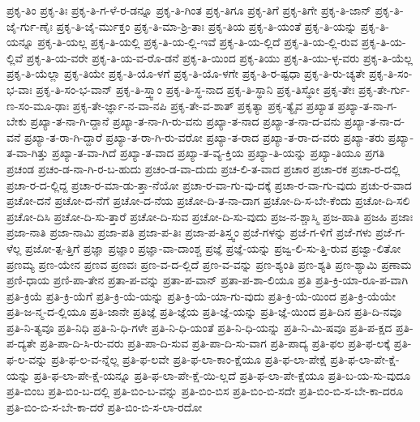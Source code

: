 {ಪ್ರಕೃ-ತಿಂ
ಪ್ರಕೃ-ತಿಃ
ಪ್ರಕೃ-ತಿ-ಗ-ಳೆ-ರ-ಡನ್ನೂ
ಪ್ರಕೃ-ತಿ-ಗಿಂತ
ಪ್ರಕೃ-ತಿಗೂ
ಪ್ರಕೃ-ತಿಗೆ
ಪ್ರಕೃ-ತಿಗೇ
ಪ್ರಕೃ-ತಿ-ಜಾನ್
ಪ್ರಕೃ-ತಿ-ಜೈ-ರ್ಗು-ಣೈಃ
ಪ್ರಕೃ-ತಿ-ಜೈ-ರ್ಮುಕ್ತಂ
ಪ್ರಕೃ-ತಿ-ಮಾ-ಶ್ರಿ-ತಾಃ
ಪ್ರಕೃ-ತಿಯ
ಪ್ರಕೃ-ತಿ-ಯಂತೆ
ಪ್ರಕೃ-ತಿ-ಯನ್ನು
ಪ್ರಕೃ-ತಿ-ಯನ್ನೂ
ಪ್ರಕೃ-ತಿ-ಯಲ್ಲ
ಪ್ರಕೃ-ತಿ-ಯಲ್ಲಿ
ಪ್ರಕೃ-ತಿ-ಯ-ಲ್ಲಿ-ಇವೆ
ಪ್ರಕೃ-ತಿ-ಯ-ಲ್ಲಿದೆ
ಪ್ರಕೃ-ತಿ-ಯ-ಲ್ಲಿ-ರುವ
ಪ್ರಕೃ-ತಿ-ಯ-ಲ್ಲಿವೆ
ಪ್ರಕೃ-ತಿ-ಯ-ವರೇ
ಪ್ರಕೃ-ತಿ-ಯ-ವ-ರೊ-ಡನೆ
ಪ್ರಕೃ-ತಿ-ಯಿಂದ
ಪ್ರಕೃ-ತಿಯು
ಪ್ರಕೃ-ತಿ-ಯು-ಳ್ಳ-ವರು
ಪ್ರಕೃ-ತಿ-ಯೆಲ್ಲ
ಪ್ರಕೃ-ತಿ-ಯೆಲ್ಲಾ
ಪ್ರಕೃ-ತಿಯೇ
ಪ್ರಕೃ-ತಿ-ಯೊ-ಳಗೆ
ಪ್ರಕೃ-ತಿ-ಯೊ-ಳಗೇ
ಪ್ರಕೃ-ತಿ-ರ-ಷ್ಟಧಾ
ಪ್ರಕೃ-ತಿ-ರು-ಚ್ಯತೇ
ಪ್ರಕೃ-ತಿ-ಸಂ-ಭ-ವಾಃ
ಪ್ರಕೃ-ತಿ-ಸಂ-ಭ-ವಾನ್
ಪ್ರಕೃ-ತಿ-ಸ್ತ್ವಾಂ
ಪ್ರಕೃ-ತಿ-ಸ್ಥ-ನಾದ
ಪ್ರಕೃ-ತಿ-ಸ್ಥಾನಿ
ಪ್ರಕೃ-ತಿಸ್ಥೋ
ಪ್ರಕೃ-ತೇಃ
ಪ್ರಕೃ-ತೇ-ರ್ಗು-ಣ-ಸಂ-ಮೂ-ಢಾಃ
ಪ್ರಕೃ-ತೇ-ರ್ಜ್ಞಾ-ನ-ವಾ-ನಪಿ
ಪ್ರಕೃ-ತೇ-ವ-ಶಾತ್
ಪ್ರಕೃತ್ಯಾ
ಪ್ರಕೃ-ತ್ಯೈವ
ಪ್ರಖ್ಯಾತ
ಪ್ರಖ್ಯಾ-ತ-ನಾ-ಗ-ಬೇಕು
ಪ್ರಖ್ಯಾ-ತ-ನಾ-ಗಿ-ದ್ದಾನೆ
ಪ್ರಖ್ಯಾ-ತ-ನಾ-ಗಿ-ರು-ವನು
ಪ್ರಖ್ಯಾ-ತ-ನಾದ
ಪ್ರಖ್ಯಾ-ತ-ನಾ-ದ-ವನು
ಪ್ರಖ್ಯಾ-ತ-ನಾ-ದ-ವನೆ
ಪ್ರಖ್ಯಾ-ತ-ರಾ-ಗಿ-ದ್ದಾರೆ
ಪ್ರಖ್ಯಾ-ತ-ರಾ-ಗಿ-ರು-ವರೋ
ಪ್ರಖ್ಯಾ-ತ-ರಾದ
ಪ್ರಖ್ಯಾ-ತ-ರಾ-ದ-ವರು
ಪ್ರಖ್ಯಾ-ತರು
ಪ್ರಖ್ಯಾ-ತ-ವಾ-ಗಿತ್ತು
ಪ್ರಖ್ಯಾ-ತ-ವಾ-ಗಿದೆ
ಪ್ರಖ್ಯಾ-ತ-ವಾದ
ಪ್ರಖ್ಯಾ-ತ-ವ್ಯ-ಕ್ತಿಯ
ಪ್ರಖ್ಯಾ-ತಿ-ಯನ್ನು
ಪ್ರಖ್ಯಾ-ತಿಯೂ
ಪ್ರಗತಿ
ಪ್ರಚಂಡ
ಪ್ರಚಂ-ಡ-ನಾ-ಗಿ-ರ-ಬ-ಹುದು
ಪ್ರಚಂ-ಡ-ವಾ-ದುದು
ಪ್ರಚ-ಲಿ-ತ-ವಾದ
ಪ್ರಚಾರ
ಪ್ರಚಾ-ರಕ
ಪ್ರಚಾ-ರ-ದಲ್ಲಿ
ಪ್ರಚಾ-ರ-ದ-ಲ್ಲಿದ್ದ
ಪ್ರಚಾ-ರ-ಮಾ-ಡು-ತ್ತಾ-ನೆಯೋ
ಪ್ರಚಾ-ರ-ವಾ-ಗು-ವು-ದಕ್ಕೆ
ಪ್ರಚಾ-ರ-ವಾ-ಗು-ವುದು
ಪ್ರಚು-ರ-ವಾದ
ಪ್ರಚೋ-ದನೆ
ಪ್ರಚೋ-ದ-ನೆಗೆ
ಪ್ರಚೋ-ದ-ನೆಯ
ಪ್ರಚೋ-ದಿ-ತ-ನಾ-ದಾಗ
ಪ್ರಚೋ-ದಿ-ಸ-ಬೇ-ಕೆಂದು
ಪ್ರಚೋ-ದಿ-ಸಲಿ
ಪ್ರಚೋ-ದಿಸಿ
ಪ್ರಚೋ-ದಿ-ಸು-ತ್ತಾರೆ
ಪ್ರಚೋ-ದಿ-ಸುವ
ಪ್ರಚೋ-ದಿ-ಸು-ವುದು
ಪ್ರಜ-ನ-ಶ್ಚಾಸ್ಮಿ
ಪ್ರಜ-ಹಾತಿ
ಪ್ರಜಹಿ
ಪ್ರಜಾಃ
ಪ್ರಜಾ-ನಾತಿ
ಪ್ರಜಾ-ನಾಮಿ
ಪ್ರಜಾ-ಪತಿ
ಪ್ರಜಾ-ಪ-ತಿಃ
ಪ್ರಜಾ-ಪ-ತಿಸ್ತ್ವಂ
ಪ್ರಜೆ-ಗಳನ್ನು
ಪ್ರಜೆ-ಗ-ಳಿಗೆ
ಪ್ರಜೆ-ಗಳು
ಪ್ರಜೆ-ಗ-ಳೆಲ್ಲ
ಪ್ರಜೋ-ತ್ಪ-ತ್ತಿಗೆ
ಪ್ರಜ್ಞಾ
ಪ್ರಜ್ಞಾಂ
ಪ್ರಜ್ಞಾ-ವಾ-ದಾಂಶ್ಚ
ಪ್ರಜ್ಞೆ
ಪ್ರಜ್ಞೆ-ಯನ್ನು
ಪ್ರಜ್ವ-ಲಿ-ಸು-ತ್ತಿ-ರುವ
ಪ್ರಜ್ವಾ-ಲಿತೋ
ಪ್ರಣಮ್ಯ
ಪ್ರಣ-ಯೇನ
ಪ್ರಣವ
ಪ್ರಣವಃ
ಪ್ರಣ-ವ-ದ-ಲ್ಲಿದೆ
ಪ್ರಣ-ವ-ವನ್ನು
ಪ್ರಣ-ಶ್ಯಂತಿ
ಪ್ರಣ-ಶ್ಯತಿ
ಪ್ರಣ-ಶ್ಯಾಮಿ
ಪ್ರಣಾಮ
ಪ್ರಣಿ-ಧಾಯ
ಪ್ರಣಿ-ಪಾ-ತೇನ
ಪ್ರತಾ-ಪ-ವನ್ನು
ಪ್ರತಾ-ಪ-ವಾನ್
ಪ್ರತಾ-ಪ-ಶಾ-ಲಿಯೂ
ಪ್ರತಿ
ಪ್ರತಿ-ಕ್ರಿ-ಯಾ-ರೂ-ಪ-ವಾಗಿ
ಪ್ರತಿ-ಕ್ರಿಯೆ
ಪ್ರತಿ-ಕ್ರಿ-ಯೆಗೆ
ಪ್ರತಿ-ಕ್ರಿ-ಯೆ-ಯನ್ನು
ಪ್ರತಿ-ಕ್ರಿ-ಯೆ-ಯಾ-ಗು-ವುದು
ಪ್ರತಿ-ಕ್ರಿ-ಯೆ-ಯಿಂದ
ಪ್ರತಿ-ಕ್ರಿ-ಯೆಯೇ
ಪ್ರತಿ-ಜ-ನ್ಮ-ದ-ಲ್ಲಿಯೂ
ಪ್ರತಿ-ಜಾನೇ
ಪ್ರತಿಜ್ಞೆ
ಪ್ರತಿ-ಜ್ಞೆಯ
ಪ್ರತಿ-ಜ್ಞೆ-ಯನ್ನು
ಪ್ರತಿ-ಜ್ಞೆ-ಯಿಂದ
ಪ್ರತಿ-ದಿನ
ಪ್ರತಿ-ದಿ-ನವೂ
ಪ್ರತಿ-ನಿ-ತ್ಯವೂ
ಪ್ರತಿ-ನಿಧಿ
ಪ್ರತಿ-ನಿ-ಧಿ-ಗಳೇ
ಪ್ರತಿ-ನಿ-ಧಿ-ಯಂತೆ
ಪ್ರತಿ-ನಿ-ಧಿ-ಯನ್ನು
ಪ್ರತಿ-ನಿ-ಮಿ-ಷವೂ
ಪ್ರತಿ-ಪ-ಕ್ಷದ
ಪ್ರತಿ-ಪ-ದ್ಯತೇ
ಪ್ರತಿ-ಪಾ-ದಿ-ಸಿ-ರು-ವರು
ಪ್ರತಿ-ಪಾ-ದಿ-ಸುವ
ಪ್ರತಿ-ಪಾ-ದಿ-ಸು-ವಾಗ
ಪ್ರತಿ-ಪಾದ್ಯ
ಪ್ರತಿ-ಫಲ
ಪ್ರತಿ-ಫ-ಲಕ್ಕೆ
ಪ್ರತಿ-ಫ-ಲ-ವನ್ನು
ಪ್ರತಿ-ಫ-ಲ-ವ-ನ್ನೆಲ್ಲ
ಪ್ರತಿ-ಫ-ಲವೇ
ಪ್ರತಿ-ಫ-ಲಾ-ಕಾಂ-ಕ್ಷೆಯೂ
ಪ್ರತಿ-ಫ-ಲಾ-ಪೇಕ್ಷೆ
ಪ್ರತಿ-ಫ-ಲಾ-ಪೇ-ಕ್ಷೆ-ಯನ್ನು
ಪ್ರತಿ-ಫ-ಲಾ-ಪೇ-ಕ್ಷೆ-ಯನ್ನೂ
ಪ್ರತಿ-ಫ-ಲಾ-ಪೇ-ಕ್ಷೆ-ಯಿ-ಲ್ಲದೆ
ಪ್ರತಿ-ಫ-ಲಾ-ಪೇ-ಕ್ಷೆಯೂ
ಪ್ರತಿ-ಬ-ಯ-ಸು-ವುದೂ
ಪ್ರತಿ-ಬಿಂಬ
ಪ್ರತಿ-ಬಿಂ-ಬ-ದಲ್ಲಿ
ಪ್ರತಿ-ಬಿಂ-ಬ-ವನ್ನು
ಪ್ರತಿ-ಬಿಂ-ಬಿಸ
ಪ್ರತಿ-ಬಿಂ-ಬಿ-ಸದೇ
ಪ್ರತಿ-ಬಿಂ-ಬಿ-ಸ-ಬೇ-ಕಾ-ದರೂ
ಪ್ರತಿ-ಬಿಂ-ಬಿ-ಸ-ಬೇ-ಕಾ-ದರೆ
ಪ್ರತಿ-ಬಿಂ-ಬಿ-ಸ-ಲಾ-ರದೋ
}
